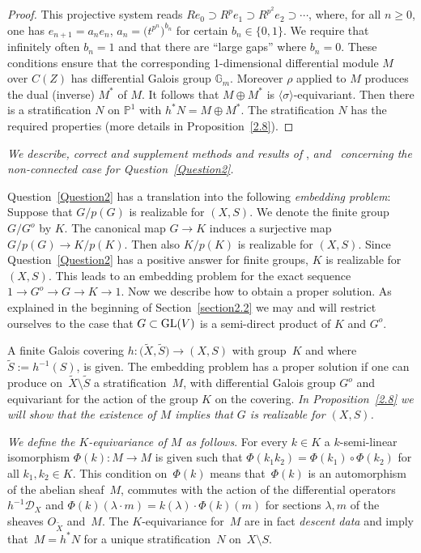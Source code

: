 \documentclass[pdftex]{sigma}
\numberwithin{equation}{section}
\begin{document}
\begin{proof}
 This projective system reads $Re_0\supset R^pe_1\supset R^{p^2}e_2\supset \cdots$,
 where, for all $n\geq 0$, one has $e_{n+1}=a_ne_n$, $a_n= \big(t^{p^n}\big)^{b_n}$ for certain $b_n\in \{0,1\}$. We require
 that infinitely often $b_n=1$ and that there are ``large gaps'' where $b_n=0$. These conditions ensure that
 the corresponding 1-dimensional differential module $M$ over $C(Z)$ has differential Galois group $\mathbb{G}_m$.
 Moreover $\rho$ applied to $M$ produces the dual (inverse) $M^*$ of $M$. It follows that
 $M\oplus M^*$ is $\langle \sigma \rangle$-equivariant. Then there is a stratification $N$
 on $\mathbb{P}^1$ with $h^*N=M\oplus M^*$. The stratification $N$ has the required
 properties (more details in Proposition~\ref{2.8}).
 \end{proof}

{\it We describe, correct and supplement methods and results of} \cite[Section~8]{Ma-vdP2}, \cite[Section~8]{Ma} {\it and}~\cite{Er} {\it concerning the non-connected case for Question~{\rm \ref{Question2}}.}

Question~\ref{Question2} has a translation into the following {\it embedding problem}: Suppose that $G/p(G)$ is realizable for $(X,S)$. We denote the finite group $G/G^o$ by $K$. The canonical map $G\rightarrow K$ induces a surjective map $G/p(G)\rightarrow K/p(K)$. Then also $K/p(K)$ is realizable for $(X,S)$. Since Question~\ref{Question2} has a positive answer for finite groups, $K$ is realizable for $(X,S)$. This leads to an embedding problem for the exact sequence $1\rightarrow G^o\rightarrow G\rightarrow K\rightarrow 1$. Now we describe how to obtain a proper solution. As explained in the beginning of Section~\ref{section2.2} we may and will restrict ourselves to the case that $G\subset {\rm GL}(V)$ is a semi-direct product of $K$ and $G^o$.

A finite Galois covering $h\colon \big(\tilde{X},\tilde{S}\big)\rightarrow (X,S)$ with group~$K$ and where $\tilde{S}:=h^{-1}(S)$, is given. The embedding problem has a proper solution if one can produce on~$\tilde{X}\setminus \tilde{S}$ a stratification~$M$, with differential Galois group $G^o$ and equivariant for the action of the group $K$ on the covering. {\it In Proposition~{\rm \ref{2.8}} we will show that the existence of $M$ implies that $G$ is realizable for $(X,S)$.}

{\it We define the $K$-equivariance of $M$ as follows}. For every $k\in K$ a $k$-semi-linear isomorphism $\Phi (k)\colon M\rightarrow M$ is given such that
$\Phi (k_1k_2)= \Phi(k_1)\circ \Phi(k_2)$ for all $k_1,k_2\in K$. This condition on~$\Phi (k)$ means that~$\Phi(k)$ is an automorphism of the abelian sheaf~$M$, commutes with the action of the differential operators $h^{-1}\mathcal{D}_{X}$ and $\Phi (k)(\lambda \cdot m)= k(\lambda) \cdot \Phi(k)(m)$ for sections $\lambda, m$ of the sheaves $O_{\tilde{X}}$ and~$M$. The $K$-equivariance for~$M$ are in fact {\it descent data} and imply that~$M=h^*N$ for a unique stratification~$N$ on~$X\setminus S$.
\end{document}
